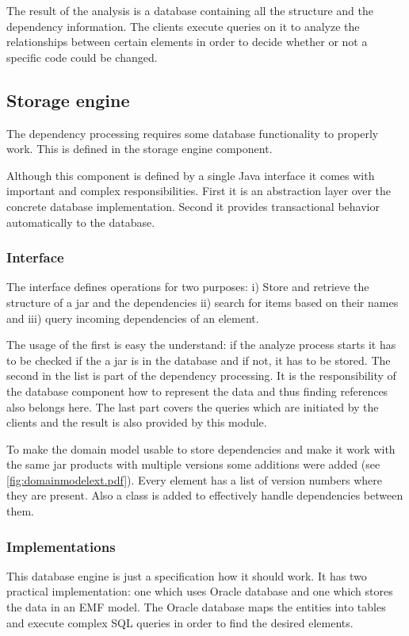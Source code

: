 The result of the analysis is a database containing all the structure
and the dependency information. The clients execute queries on it to analyze the
relationships between certain elements in order to decide whether or not a
specific code could be changed.
 
 
\subsection{Storage engine} 
The dependency processing requires some database functionality to 
properly work. This is defined in the storage engine component.

Although this component is defined by a single Java interface it comes with
important and complex responsibilities. First it is an abstraction layer over
the concrete database implementation. Second it provides transactional behavior
automatically to the database. 

\subsubsection{Interface}
The interface defines operations for two purposes: i) Store and retrieve the
structure of a jar and the dependencies ii) search for items based on their
names and iii) query incoming dependencies of an element.

The usage of the first is easy the understand: if the analyze process starts it
has to be checked if the a jar is in the database and if not, it has to be
stored. The second in the list is part of the dependency processing. It is the
responsibility of the database component how to represent the data and thus
finding references also belongs here. The last part covers the queries which are
initiated by the clients and the result is also provided by this module.

To make the domain model usable to store dependencies and make it work with the
same jar products with multiple versions some additions were added (see
\autoref{fig:domainmodelext.pdf}).  Every element has a list of version numbers where they are
present. Also a  class is added to effectively handle
dependencies between them.

\subsubsection{Implementations}
This database engine is just a specification how it should work. It has two
practical implementation: one which uses Oracle database and one which stores
the data in an EMF model. The Oracle database maps the entities into tables and
execute complex SQL queries in order to find the desired elements.

